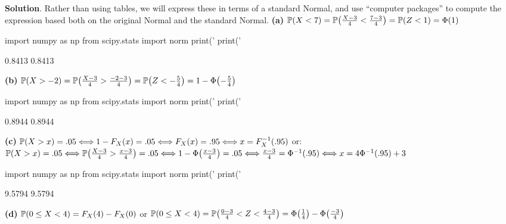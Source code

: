 \textbf{Solution}.
Rather than using tables, we will express these in terms of a standard
Normal, and use ``computer packages'' to compute the expression based
both on the original Normal and the standard Normal.
\textbf{(a)}
\(\PROB(X < 7) = \PROB\left(\frac{X - 3}{4} < \frac{7 - 3}{4} \right) = \PROB\left(Z < 1 \right) = \Phi\left( 1 \right)\)

\begin{python}
import numpy as np
from scipy.stats import norm
print('%
print('%
\end{python}
\begin{console}
0.8413
0.8413
\end{console}
\textbf{(b)} $\PROB(X > -2) =
\PROB\left(\frac{X - 3}{4} > \frac{-2 - 3}{4} \right)
= \PROB\left(Z < -\frac{5}{4} \right) = 1 - \Phi\left(
-\frac{5}{4} \right) $

\begin{python}
import numpy as np
from scipy.stats import norm
print('%
print('%
\end{python}
\begin{console}
0.8944
0.8944
\end{console}
\textbf{(c)} \(\operatorname{\mathbb{P}}(X > x) = .05
\Longleftrightarrow 1 - F_X(x) = .05
\Longleftrightarrow F_X(x) = .95
\Longleftrightarrow x = F_X^{-1}(.95)\)
or: \(\PROB(X > x) = .05
\Longleftrightarrow \PROB\left(\frac{X - 3}{4} > \frac{x - 3}{4}\right) = .05
\Longleftrightarrow 1 - \Phi\left(\frac{x - 3}{4}\right) = .05
\Longleftrightarrow \frac{x - 3}{4} = \Phi^{-1}(.95)
\Longleftrightarrow x = 4 \Phi^{-1}(.95) + 3\)

\begin{python}
import numpy as np
from scipy.stats import norm
print('%
print('%
\end{python}
\begin{console}
9.5794
9.5794
\end{console}
\textbf{(d)} \(\operatorname{\mathbb{P}}(0 \leq X < 4) = F_X(4) - F_X(0)\)
or
\(\PROB(0 \leq X < 4) = \PROB\left(\frac{0 - 3}{4} < Z < \frac{4 - 3}{4} \right) = \Phi\left( \frac{1}{4} \right) - \Phi\left( \frac{-3}{4} \right)\)

